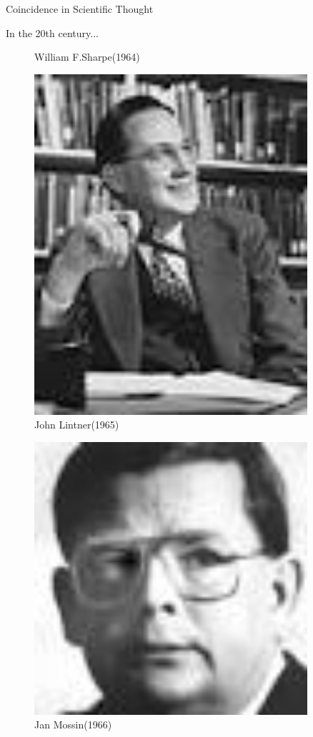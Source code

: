 \documentclass{beamer}
\begin{document}
\begin{frame}{Coincidence in Scientific Thought}
\begin{block}{In the 20th century...}
\begin{figure}
\begin{minipage}[t]{0.24\textwidth}
			\alert{William F.Sharpe(1964)}
		\end{minipage}
		\begin{minipage}[t]{0.24\textwidth}
			\centering
			\includegraphics[width=0.9\textwidth]{John.jpg}\\
			John Lintner(1965)
		\end{minipage}
		\begin{minipage}[t]{0.24\textwidth}
			\centering
			\includegraphics[width=0.9\textwidth]{Jan.jpg}\\
			Jan Mossin(1966)
		\end{minipage}
	\end{figure}
	\end{block}
\end{frame}
\end{document}

